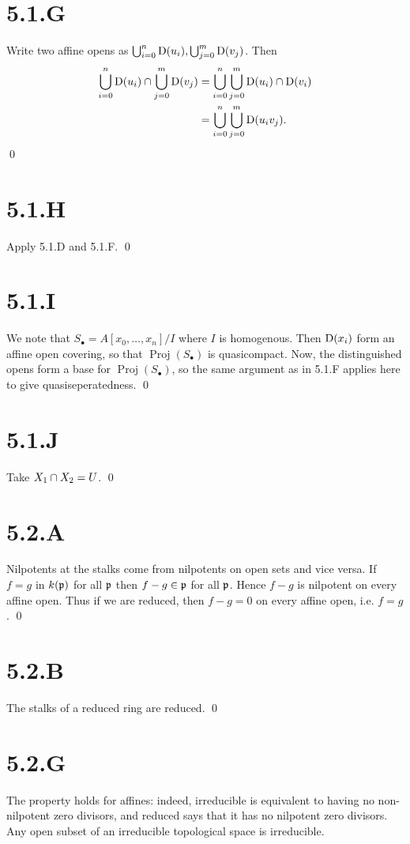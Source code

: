 \documentclass{article}
\begin{document}
\section{5.1.G}
Write two affine opens as $\bigcup_{i=0}^n \operatorname{D}(u_i), \bigcup_{j=0}^m
    \operatorname{D}(v_j)$. Then
\begin{align*}
    \bigcup_{i=0}^n \operatorname{D}(u_i) \cap \bigcup_{j=0}^m \operatorname{D}(v_j) & = \bigcup_{i=0}^n \bigcup_{j=0}^m \operatorname{D}(u_i) \cap \operatorname{D}(v_i) \\
                                                             & = \bigcup_{i=0}^n \bigcup_{j=0}^m \operatorname{D}(u_iv_j).
\end{align*}
\qed

\section{5.1.H}
Apply 5.1.D and 5.1.F. \qed

\section{5.1.I}
We note that $S_{\bullet} = A[x_0, \dots, x_n]/I$ where $I$ is
homogenous. Then $\operatorname{D}(x_i)$ form an affine open covering, so that
$\operatorname{Proj}(S_{\bullet})$ is quasicompact. Now, the distinguished opens form a
base for $\operatorname{Proj}(S_{\bullet})$, so the same argument as in 5.1.F applies here
to give quasiseperatedness. \qed

\section{5.1.J}
Take $X_1 \cap X_2 = U$. \qed

\section{5.2.A}
Nilpotents at the stalks come from nilpotents on open sets and vice versa. If
$f=g$ in $k(\mathfrak{p})$ for all
$\mathfrak{p}$ then $f-g \in \mathfrak{p}$ for all
$\mathfrak{p}$. Hence $f-g$ is nilpotent on every
affine open. Thus if we are reduced, then $f-g=0$ on every
affine open, i.e. $f=g$. \qed

\section{5.2.B}
The stalks of a reduced ring are reduced. \qed

\section{5.2.G}
The property holds for affines: indeed, irreducible is equivalent to having no
non-nilpotent zero divisors, and reduced says that it has no nilpotent zero
divisors. Any open subset of an irreducible topological space is irreducible.
\end{document}
